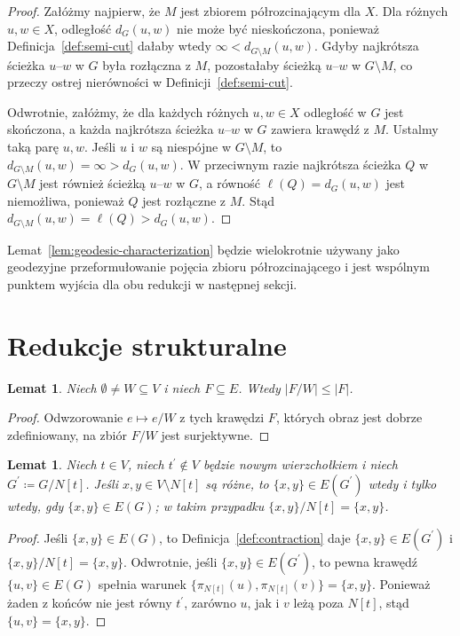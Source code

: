 \documentclass[11pt,a4paper]{amsart}
\theoremstyle{definition}
\theoremstyle{plain}
\newtheorem{lemma}[definition]{Lemat}
\newcommand{\len}[1]{\ell(#1)}
\newcommand{\dist}[3]{d_{#1}(#2,#3)}
\begin{document}
\begin{proof}
Załóżmy najpierw, że $M$ jest zbiorem półrozcinającym dla $X$. Dla różnych $u,w\in X$, odległość $\dist{G}{u}{w}$ nie może być nieskończona, ponieważ Definicja~\ref{def:semi-cut} dałaby wtedy $\infty<\dist{G\setminus M}{u}{w}$. Gdyby najkrótsza ścieżka $u$--$w$ w $G$ była rozłączna z $M$, pozostałaby ścieżką $u$--$w$ w $G\setminus M$, co przeczy ostrej nierówności w Definicji~\ref{def:semi-cut}.

Odwrotnie, załóżmy, że dla każdych różnych $u,w\in X$ odległość w $G$ jest skończona, a każda najkrótsza ścieżka $u$--$w$ w $G$ zawiera krawędź z $M$. Ustalmy taką parę $u,w$. Jeśli $u$ i $w$ są niespójne w $G\setminus M$, to $\dist{G\setminus M}{u}{w}=\infty>\dist{G}{u}{w}$. W przeciwnym razie najkrótsza ścieżka $Q$ w $G\setminus M$ jest również ścieżką $u$--$w$ w $G$, a równość $\len{Q}=\dist{G}{u}{w}$ jest niemożliwa, ponieważ $Q$ jest rozłączne z $M$. Stąd $\dist{G\setminus M}{u}{w}=\len{Q}>\dist{G}{u}{w}$.
\end{proof}

Lemat~\ref{lem:geodesic-characterization} będzie wielokrotnie używany jako geodezyjne przeformułowanie pojęcia zbioru półrozcinającego i jest wspólnym punktem wyjścia dla obu redukcji w następnej sekcji.

\section{Redukcje strukturalne}

\begin{lemma}\label{lem:contraction-image-size}
Niech $\emptyset\neq W\subseteq V$ i niech $F\subseteq E$. Wtedy $|F/W|\le |F|$.
\end{lemma}

\begin{proof}
Odwzorowanie $e\mapsto e/W$ z tych krawędzi $F$, których obraz jest dobrze zdefiniowany, na zbiór $F/W$ jest surjektywne.
\end{proof}

\begin{lemma}\label{lem:outside-edges}
Niech $t\in V$, niech $t^\prime\notin V$ będzie nowym wierzchołkiem i niech $G^\prime\coloneqq G/N[t]$. Jeśli $x,y\in V\setminus N[t]$ są różne, to $\{x,y\}\in E(G^\prime)$ wtedy i tylko wtedy, gdy $\{x,y\}\in E(G)$; w takim przypadku $\{x,y\}/N[t]=\{x,y\}$.
\end{lemma}

\begin{proof}
Jeśli $\{x,y\}\in E(G)$, to Definicja~\ref{def:contraction} daje $\{x,y\}\in E(G^\prime)$ i $\{x,y\}/N[t]=\{x,y\}$. Odwrotnie, jeśli $\{x,y\}\in E(G^\prime)$, to pewna krawędź $\{u,v\}\in E(G)$ spełnia warunek $\{\pi_{N[t]}(u),\pi_{N[t]}(v)\}=\{x,y\}$. Ponieważ żaden z końców nie jest równy $t^\prime$, zarówno $u$, jak i $v$ leżą poza $N[t]$, stąd $\{u,v\}=\{x,y\}$.
\end{proof}
\end{document}
